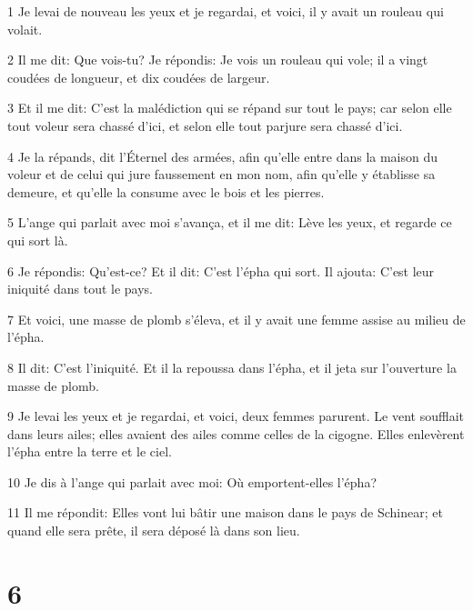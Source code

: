 \par 1 Je levai de nouveau les yeux et je regardai, et voici, il y avait un rouleau qui volait.
\par 2 Il me dit: Que vois-tu? Je répondis: Je vois un rouleau qui vole; il a vingt coudées de longueur, et dix coudées de largeur.
\par 3 Et il me dit: C'est la malédiction qui se répand sur tout le pays; car selon elle tout voleur sera chassé d'ici, et selon elle tout parjure sera chassé d'ici.
\par 4 Je la répands, dit l'Éternel des armées, afin qu'elle entre dans la maison du voleur et de celui qui jure faussement en mon nom, afin qu'elle y établisse sa demeure, et qu'elle la consume avec le bois et les pierres.
\par 5 L'ange qui parlait avec moi s'avança, et il me dit: Lève les yeux, et regarde ce qui sort là.
\par 6 Je répondis: Qu'est-ce? Et il dit: C'est l'épha qui sort. Il ajouta: C'est leur iniquité dans tout le pays.
\par 7 Et voici, une masse de plomb s'éleva, et il y avait une femme assise au milieu de l'épha.
\par 8 Il dit: C'est l'iniquité. Et il la repoussa dans l'épha, et il jeta sur l'ouverture la masse de plomb.
\par 9 Je levai les yeux et je regardai, et voici, deux femmes parurent. Le vent soufflait dans leurs ailes; elles avaient des ailes comme celles de la cigogne. Elles enlevèrent l'épha entre la terre et le ciel.
\par 10 Je dis à l'ange qui parlait avec moi: Où emportent-elles l'épha?
\par 11 Il me répondit: Elles vont lui bâtir une maison dans le pays de Schinear; et quand elle sera prête, il sera déposé là dans son lieu.

\chapter{6}

